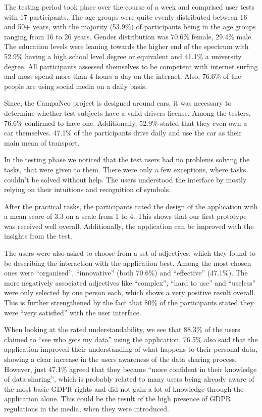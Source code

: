 \documentclass[../paper.tex]{subfiles}
\begin{document}
  The testing period took place over the course of a week and comprised
  user tests with 17 participants. The age groups were quite evenly
  distributed between 16 and 50+ years, with the majority (53.9\%) of
  participants being in the age groups ranging from 16 to 26 years.
  Gender distribution was 70.6\% female, 29.4\% male. The education levels
  were leaning towards the higher end of the spectrum with 52.9\% having a
  high school level degree or equivalent and 41.1\% a university degree.
  All participants assessed themselves to be competent with internet
  surfing and most spend more than 4 hours a day on the internet. Also,
  76.6\% of the people are using social media on a daily basis.

  Since, the CampaNeo project is designed around cars, it was necessary to
  determine whether test subjects have a valid drivers license. Among
  the testers, 76.6\% confirmed to have one. Additionally, 52.9\% stated
  that they even own a car themselves. 47.1\% of the participants drive daily
  and use the car as their main mean of transport.

  In the testing phase we noticed that the test users had no problems solving
  the tasks, that were given to them. There were only a few exceptions, where
  tasks couldn't be solved without help. The users understood the interface by
  mostly relying on their intuitions and recognition of symbols.

  After the practical tasks, the participants rated the design of the
  application with a mean score of 3.3 on a scale from 1 to 4. This shows
  that our first prototype was received well overall. Additionally, the
  application can be improved with the insights from the test.

  The users were also asked to choose from a set of adjectives, which they
  found to be describing the interaction with the application best. Among the
  most chosen ones were ``organised'', ``innovative'' (both 70.6\%) and
  ``effective'' (47.1\%). The more negatively associated adjectives like
  ``complex'', ``hard to use'' and ``useless'' were only selected by one person
  each, which shows a very positive result overall. This is further strengthened
  by the fact that 80\% of the participants stated they were ``very satisfied''
  with the user interface.

  When looking at the rated understandability, we see that 88.3\% of the users
  claimed to ``see who gets my data'' using the application. 76.5\% also said
  that the application improved their understanding of what happens to their
  personal data, showing a clear increase in the users awareness of the data
  sharing process. However, just 47.1\% agreed that they became ``more confident
  in their knowledge of data sharing'', which is probably related to many users
  being already aware of the most basic GDPR rights and did not gain a lot of
  knowledge through the application alone. This could be the result of the high
  presence of GDPR regulations in the media, when they were introduced.
\end{document}
